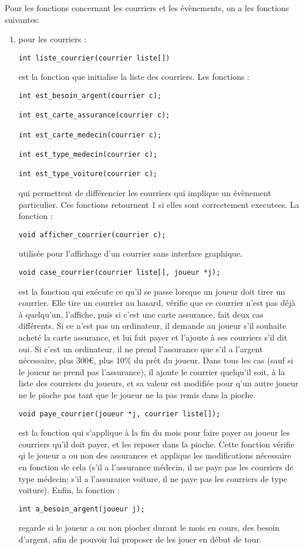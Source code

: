 \documentclass[a4paper, 11pt]{report}
\begin{document}
Pour les fonctions concernant les courriers et les évènements, on a les fonctions suivantes:
\begin{enumerate}
\item pour les courriers :

\begin{verbatim}
int liste_courrier(courrier liste[])
\end{verbatim}
est la fonction que initialise la liste des courriers.
Les fonctions :

\begin{verbatim}
int est_besoin_argent(courrier c); 

int est_carte_assurance(courrier c);

int est_carte_medecin(courrier c);

int est_type_medecin(courrier c);

int est_type_voiture(courrier c);
\end{verbatim}

qui permettent de différencier les courriers qui implique un évènement particulier. Ces fonctions retournent 1 si elles sont corrcetement executees.
La fonction :
\begin{verbatim}
void afficher_courrier(courrier c);
\end{verbatim}
utilisée pour l'affichage d'un courrier sans interface graphique.
\begin{verbatim}
void case_courrier(courrier liste[], joueur *j);
\end{verbatim}
est la fonction qui exécute ce qu'il se passe lorsque un joueur doit tirer un courrier. Elle tire un courrier au hasard, vérifie que ce courrier n'est pas déjà à quelqu'un, l'affiche, puis si c'est une carte assurance, fait deux cas différents. Si ce n'est pas un ordinateur, il demande au joueur s'il souhaite acheté la carte assurance, et lui fait payer et l'ajoute à ses courriers s'il dit oui. Si c'est un ordinateur, il ne prend l'assurance que s'il a l'argent nécessaire, plus 300\euro{}, plus 10\% du prêt du joueur. Dans tous les cas (sauf si le joueur ne prend pas l'assurance), il ajoute le courrier quelqu'il soit, à la liste des courriers du joueurs, et sa valeur est modifiée pour q'un autre joueur ne le pioche pas tant que le joueur ne la pas remis dans la pioche.

\begin{verbatim}
void paye_courrier(joueur *j, courrier liste[]);
\end{verbatim}
est la fonction qui s'applique à la fin du mois pour faire payer au joueur les courriers qu'il doit payer, et les reposer dans la pioche. Cette fonction vérifie qi le joueur a ou non des assurances et applique les modifications nécessaire en fonction de cela (s'il a l'assurance médecin, il ne paye pas les courriers de type médecin; s'il a l'assurance voiture, il ne paye pas les courriers de type voiture).
Enfin, la fonction :
\begin{verbatim}
int a_besoin_argent(joueur j);
\end{verbatim}
regarde si le joueur a ou non piocher durant le mois en cours, des besoin d'argent, afin de pouvoir lui proposer de les jouer en début de tour.


\end{enumerate}
\end{document}
